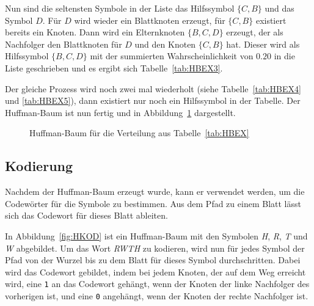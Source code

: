 \documentclass[twoside,11pt,a4paper]{article}
\theoremstyle{break}
\begin{document}
Nun sind die seltensten Symbole in der Liste das Hilfssymbol $\{C,
B\}$ und das Symbol $D$. Für $D$ wird wieder ein Blattknoten erzeugt,
für $\{C, B\}$ existiert bereits ein Knoten. Dann wird ein
Elternknoten $\{B, C, D\}$ erzeugt, der als Nachfolger den Blattknoten
für $D$ und den Knoten $\{C, B\}$ hat. Dieser wird als Hilfssymbol
$\{B, C, D\}$ mit der summierten Wahrscheinlichkeit von $0.20$ in die
Liste geschrieben und es ergibt sich Tabelle~\ref{tab:HBEX3}.

Der gleiche Prozess wird noch zwei mal wiederholt (siehe
Tabelle~\ref{tab:HBEX4} und \ref{tab:HBEX5}), dann existiert nur noch
ein Hilfssymbol in der Tabelle. Der Huffman-Baum ist nun fertig und in
Abbildung~\ref{fig:HBEX} dargestellt.

\begin{figure}[h]
\centering
{}
\caption{Huffman-Baum für die Verteilung aus Tabelle~\ref{tab:HBEX}} \label{fig:HBEX}
\end{figure}


\subsection{Kodierung}
Nachdem der Huffman-Baum erzeugt wurde, kann er verwendet werden, um
die Codewörter für die Symbole zu bestimmen. Aus dem Pfad zu einem
Blatt lässt sich das Codewort für dieses Blatt ableiten.

In Abbildung~\ref{fig:HKOD} ist ein Huffman-Baum mit den Symbolen
\emph{H}, \emph{R}, \emph{T} und \emph{W} abgebildet. Um das Wort
\emph{RWTH} zu kodieren, wird nun für jedes Symbol der Pfad von der
Wurzel bis zu dem Blatt für dieses Symbol durchschritten. Dabei wird das
Codewort gebildet, indem bei jedem Knoten, der auf dem Weg erreicht
wird, eine {\tt1} an das Codewort gehängt, wenn der Knoten der linke
Nachfolger des vorherigen ist, und eine {\tt0} angehängt, wenn der
Knoten der rechte Nachfolger ist.
\end{document}
